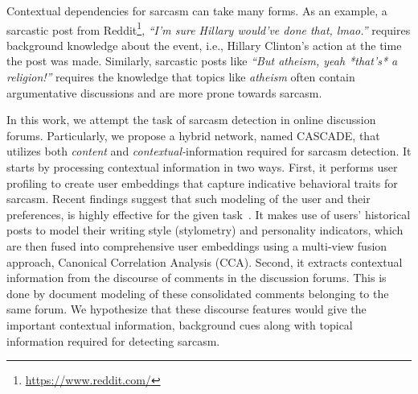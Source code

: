 \documentclass[11pt]{article}
\begin{document}
Contextual dependencies for sarcasm can take many forms. As an example, a sarcastic post from Reddit\footnote{\protect\url{https://www.reddit.com/}}, \textit{``I'm sure Hillary would've done that, lmao.''} requires background knowledge about the event, i.e., Hillary Clinton's action at the time the post was made. Similarly, sarcastic posts like \textit{``But atheism, yeah *that's* a religion!''} requires the knowledge that topics like \textit{atheism} often contain argumentative discussions and are more prone towards sarcasm. 

In this work, we attempt the task of sarcasm detection in online discussion forums. Particularly, we propose 
a hybrid network, named CASCADE, that utilizes both \textit{content} and \textit{contextual-}information required for sarcasm detection. It starts by processing contextual information in two ways. First, it performs user profiling to create user embeddings that capture indicative behavioral traits for sarcasm. Recent findings suggest that such modeling of the user and their preferences, is highly effective for the given task~\cite{amir2016modelling}. It makes use of users' historical posts to model their writing style (stylometry) and personality indicators, which are then fused into comprehensive user embeddings using a multi-view fusion approach, Canonical Correlation Analysis (CCA). Second, it extracts contextual information from the discourse of comments in the discussion forums. This is done by document modeling of these consolidated comments belonging to the same forum. We hypothesize that these discourse features would give the important contextual information, background cues along with topical information required for detecting sarcasm.
\end{document}
